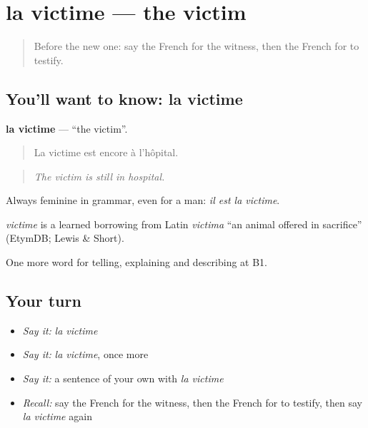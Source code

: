 \section[la victime]{la victime — the victim}

\label{lesson:FR-C389-victime}



\begin{quote}
Before the new one: say the French for the witness, then the French for to testify.
\end{quote}

\subsection*{You'll want to know: la victime}
\textbf{la victime} — \textquotedblleft{}the victim\textquotedblright{}.

\begin{quote}
La victime est encore à l'hôpital.
\end{quote}

\begin{quote}
\emph{The victim is still in hospital.}
\end{quote}

Always feminine in grammar, even for a man: \emph{il est la victime}.

\begin{cousinweb}
\emph{victime} is a learned borrowing from Latin \emph{victima} \textquotedblleft{}an animal offered in sacrifice\textquotedblright{} (EtymDB; Lewis \& Short).
\end{cousinweb}

\begin{grammarlens}[title={What you've built}]
One more word for telling, explaining and describing at B1.
\end{grammarlens}

\subsection*{Your turn}
\begin{itemize}
\raggedright
  \item \emph{Say it:} \emph{la victime}
  \item \emph{Say it:} \emph{la victime}, once more
  \item \emph{Say it:} a sentence of your own with \emph{la victime}
  \item \emph{Recall:} say the French for the witness, then the French for to testify, then say \emph{la victime} again
\end{itemize}

